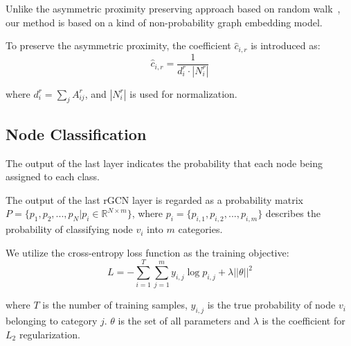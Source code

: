 Unlike the asymmetric proximity preserving approach based on random walk~\cite{zhou2017scalable}, our method is based on a kind of non-probability graph embedding model.
 
To preserve the asymmetric proximity, the coefficient $\hat c_{i,r}$ is introduced as:
\begin{equation}
\hat c_{i,r}=\frac{1}{d_i^r\cdot |N_i^r|}
\end{equation}

\noindent where $d_i^r=\sum_{j}A^r_{ij}$, and $|N_i^r|$ is used for normalization.



\subsection{Node Classification}
The output of the last layer indicates the probability that each node being assigned to each class.

The output of the last rGCN layer is regarded as a probability matrix $P=\{p_1,p_2,...,p_N|p_i\in \mathbb{R}^{N \times m}\}$, where $p_i=\{p_{i,1},p_{i,2},...,p_{i,m}\}$ describes the probability of classifying node $v_i$ into $m$ categories.

We utilize the cross-entropy loss function as the training objective:
\begin{equation}
L=-\sum_{i=1}^T\sum_{j=1}^m y_{i,j}\log p_{i,j}+\lambda ||\theta||^2
\end{equation}

\noindent where $T$ is the number of training samples, $y_{i,j}$ is the true probability of node $v_i$ belonging to category $j$. $\theta$ is the set of all parameters and $\lambda$ is the coefficient for $L_2$  regularization.
